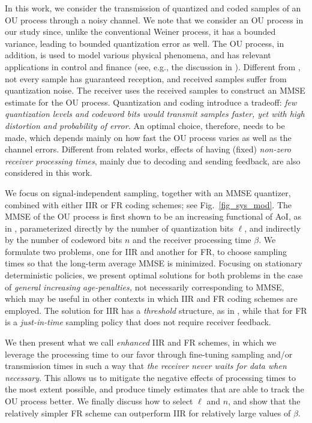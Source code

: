 \documentclass[12pt,journal,onecolumn]{IEEEtran}
\begin{document}
In this work, we consider the transmission of quantized and coded samples of an OU process through a noisy channel. We note that we consider an OU process in our study since, unlike the conventional Weiner process, it has a bounded variance, leading to bounded quantization error as well. The OU process, in addition, is used to model various physical phenomena, and has relevant applications in control and finance (see, e.g., the discussion in \cite{ornee-aoi-estimation-ou}). Different from \cite{ornee-aoi-estimation-ou}, not every sample has guaranteed reception, and received samples suffer from quantization noise. The receiver uses the received samples to construct an MMSE estimate for the OU process. Quantization and coding introduce a tradeoff: {\it few quantization levels and codeword bits would transmit samples faster, yet with high distortion and probability of error.} An optimal choice, therefore, needs to be made, which depends mainly on how fast the OU process varies as well as the channel errors. Different from related works, effects of having (fixed) {\it non-zero receiver processing times}, mainly due to decoding and sending feedback, are also considered in this work.

We focus on signal-independent sampling, together with an MMSE quantizer, combined with either IIR or FR coding schemes; see Fig.~\ref{fig_sys_mod}. The MMSE of the OU process is first shown to be an increasing functional of AoI, as in \cite{ornee-aoi-estimation-ou}, parameterized directly by the number of quantization bits $\ell$, and indirectly by the number of codeword bits $n$ and the receiver processing time $\beta$. We formulate two problems, one for IIR and another for FR, to choose sampling times so that the long-term average MMSE is minimized. Focusing on stationary deterministic policies, we present optimal solutions for both problems in the case of {\it general increasing age-penalties,} not necessarily corresponding to MMSE, which may be useful in other contexts in which IIR and FR coding schemes are employed. The solution for IIR has a {\it threshold} structure, as in \cite{sun-cyr-aoi-non-linear, ornee-aoi-estimation-ou}, while that for FR is a {\it just-in-time} sampling policy that does not require receiver feedback.

We then present what we call {\it enhanced} IIR and FR schemes, in which we leverage the processing time to our favor through fine-tuning sampling and/or transmission times in such a way that {\it the receiver never waits for data when necessary.} This allows us to mitigate the negative effects of processing times to the most extent possible, and produce timely estimates that are able to track the OU process better. We finally discuss how to select $\ell$ and $n$, and show that the relatively simpler FR scheme can outperform IIR for relatively large values of $\beta$.
\end{document}
